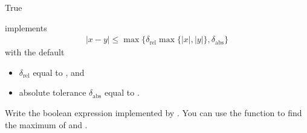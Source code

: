 \documentclass[letterpaper,10pt,english]{sphinxmanual}
\begin{document}
\begin{sphinxVerbatim}[commandchars=\\\{\}]
 
 
\end{sphinxVerbatim}

\begin{sphinxVerbatim}[commandchars=\\\{\}]
True
\end{sphinxVerbatim}


 implements
\begin{equation*}
\begin{split} |x - y| \leq \max\{\delta_{\text{rel}} \max\{|x|,|y|\},\delta_{\text{abs}}\}\end{split}
\end{equation*}
with the default
\begin{itemize}
\item {} 
 \(\delta_{\text{rel}}\) equal to , and

\item {} 
absolute tolerance \(\delta_{\text{abs}}\) equal to .

\end{itemize}

 Write the boolean expression implemented by . You can use the function  to find the maximum of  and .

\begin{sphinxVerbatim}[commandchars=\\\{\}]
    
    
      
\end{sphinxVerbatim}
\end{document}
